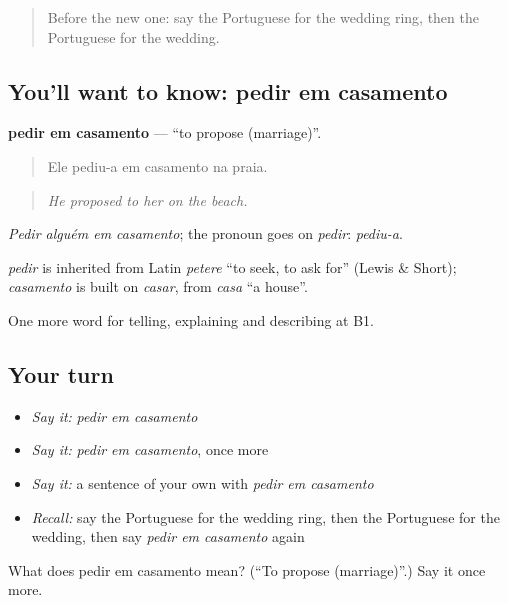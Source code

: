 \begin{quote}
Before the new one: say the Portuguese for the wedding ring, then the Portuguese for the wedding.
\end{quote}

\subsection*{You'll want to know: pedir em casamento}
\textbf{pedir em casamento} — \textquotedblleft{}to propose (marriage)\textquotedblright{}.

\begin{quote}
Ele pediu-a em casamento na praia.
\end{quote}

\begin{quote}
\emph{He proposed to her on the beach.}
\end{quote}

\emph{Pedir alguém em casamento}; the pronoun goes on \emph{pedir}: \emph{pediu-a}.

\begin{cousinweb}
\emph{pedir} is inherited from Latin \emph{petere} \textquotedblleft{}to seek, to ask for\textquotedblright{} (Lewis \& Short); \emph{casamento} is built on \emph{casar}, from \emph{casa} \textquotedblleft{}a house\textquotedblright{}.
\end{cousinweb}

\begin{grammarlens}[title={What you've built}]
One more word for telling, explaining and describing at B1.
\end{grammarlens}

\subsection*{Your turn}
\begin{itemize}
\raggedright
  \item \emph{Say it:} \emph{pedir em casamento}
  \item \emph{Say it:} \emph{pedir em casamento}, once more
  \item \emph{Say it:} a sentence of your own with \emph{pedir em casamento}
  \item \emph{Recall:} say the Portuguese for the wedding ring, then the Portuguese for the wedding, then say \emph{pedir em casamento} again
\end{itemize}

\begin{tcolorbox}[breakable,colback=teal!4,colframe=teal!35!black,title={Before you move on}]
What does pedir em casamento mean? (\textquotedblleft{}To propose (marriage)\textquotedblright{}.) Say it once more.
\end{tcolorbox}
